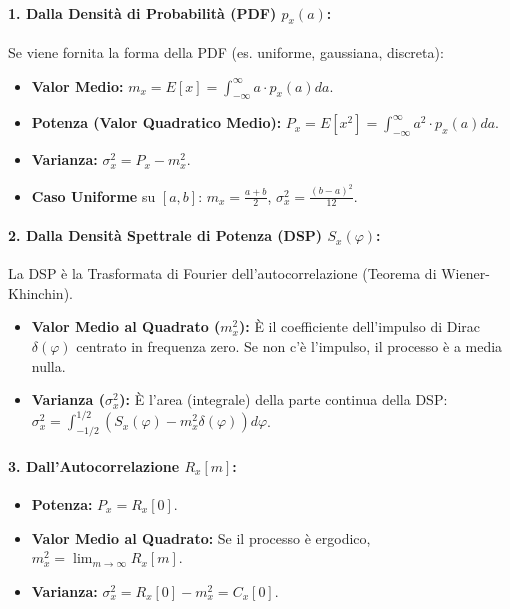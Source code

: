 \paragraph{1. Dalla Densità di Probabilità (PDF) $p_x(a)$:}
Se viene fornita la forma della PDF (es. uniforme, gaussiana, discreta):
\begin{itemize}
    \item \textbf{Valor Medio:} $m_x = E[x] = \int_{-\infty}^{\infty} a \cdot p_x(a) da$.
    \item \textbf{Potenza (Valor Quadratico Medio):} $P_x = E[x^2] = \int_{-\infty}^{\infty} a^2 \cdot p_x(a) da$.
    \item \textbf{Varianza:} $\sigma_x^2 = P_x - m_x^2$.
    \item \textbf{Caso Uniforme} su $[a, b]$: $m_x = \frac{a+b}{2}$, $\sigma_x^2 = \frac{(b-a)^2}{12}$.
\end{itemize}

\paragraph{2. Dalla Densità Spettrale di Potenza (DSP) $S_x(\varphi)$:}
La DSP è la Trasformata di Fourier dell'autocorrelazione (Teorema di Wiener-Khinchin).
\begin{itemize}
    \item \textbf{Valor Medio al Quadrato ($m_x^2$):} È il coefficiente dell'impulso di Dirac $\delta(\varphi)$ centrato in frequenza zero. Se non c'è l'impulso, il processo è a media nulla.
    \item \textbf{Varianza ($\sigma_x^2$):} È l'area (integrale) della parte continua della DSP: $\sigma_x^2 = \int_{-1/2}^{1/2} (S_x(\varphi) - m_x^2\delta(\varphi)) d\varphi$.
\end{itemize}

\paragraph{3. Dall'Autocorrelazione $R_x[m]$:}
\begin{itemize}
    \item \textbf{Potenza:} $P_x = R_x[0]$.
    \item \textbf{Valor Medio al Quadrato:} Se il processo è ergodico, $m_x^2 = \lim_{m \to \infty} R_x[m]$.
    \item \textbf{Varianza:} $\sigma_x^2 = R_x[0] - m_x^2 = C_x[0]$.
\end{itemize}

